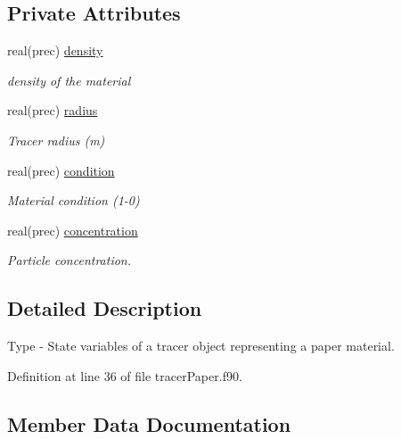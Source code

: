 \subsection*{Private Attributes}
\begin{DoxyCompactItemize}
\item 
real(prec) \mbox{\hyperlink{structtracerpaper__mod_1_1paper__state__class_a87732840a207f7c0227040cf56f40441}{density}}
\begin{DoxyCompactList}\small\item\em density of the material \end{DoxyCompactList}\item 
real(prec) \mbox{\hyperlink{structtracerpaper__mod_1_1paper__state__class_aca8ba08eafd11071094fd7749b6bf3c7}{radius}}
\begin{DoxyCompactList}\small\item\em Tracer radius (m) \end{DoxyCompactList}\item 
real(prec) \mbox{\hyperlink{structtracerpaper__mod_1_1paper__state__class_a8821f663963b1a995fb720b63093fea7}{condition}}
\begin{DoxyCompactList}\small\item\em Material condition (1-\/0) \end{DoxyCompactList}\item 
real(prec) \mbox{\hyperlink{structtracerpaper__mod_1_1paper__state__class_a7a1eeb300aeedc086104f5a2e07df586}{concentration}}
\begin{DoxyCompactList}\small\item\em Particle concentration. \end{DoxyCompactList}\end{DoxyCompactItemize}


\subsection{Detailed Description}
Type -\/ State variables of a tracer object representing a paper material. 

Definition at line 36 of file tracer\+Paper.\+f90.



\subsection{Member Data Documentation}
\mbox{\label{structtracerpaper__mod_1_1paper__state__class_a7a1eeb300aeedc086104f5a2e07df586}} 
